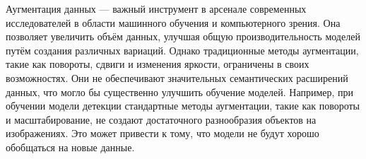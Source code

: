 \documentclass[11pt]{article}
\begin{document}


Аугментация данных — важный инструмент в арсенале современных исследователей в области машинного обучения и компьютерного зрения. Она позволяет увеличить объём данных, улучшая общую производительность моделей путём создания различных вариаций. Однако традиционные методы аугментации, такие как повороты, сдвиги и изменения яркости, ограничены в своих возможностях. Они не обеспечивают значительных семантических расширений данных, что могло бы существенно улучшить обучение моделей. Например, при обучении модели детекции стандартные методы аугментации, такие как повороты и масштабирование, не создают достаточного разнообразия объектов на изображениях. Это может привести к тому, что модели не будут хорошо обобщаться на новые данные.



\end{document}
